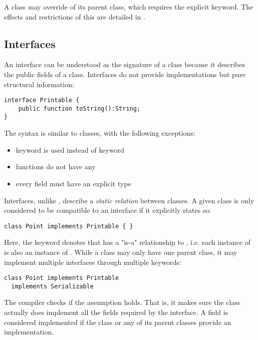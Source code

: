 A class may override  of its parent class, which requires the explicit  keyword. The effects and restrictions of this are detailed in .


\subsection{Interfaces}
\label{types-interfaces}

An interface can be understood as the signature of a class because it describes the public fields of a class. Interfaces do not provide implementations but pure structural information:

\begin{lstlisting}
interface Printable {
	public function toString():String;
}
\end{lstlisting}
The syntax is similar to classes, with the following exceptions:

\begin{itemize}
	\item {} keyword is used instead of  keyword
	\item functions do not have any 
	\item every field must have an explicit type
\end{itemize}
Interfaces, unlike , describe a \emph{static relation} between classes. A given class is only considered to be compatible to an interface if it explicitly states so:

\begin{lstlisting}
class Point implements Printable { }
\end{lstlisting}
Here, the  keyword denotes that  has a "is-a" relationship to , i.e. each instance of  is also an instance of . While a class may only have one parent class, it may implement multiple interfaces through multiple  keywords:

\begin{lstlisting}
class Point implements Printable
  implements Serializable
\end{lstlisting}

The compiler checks if the  assumption holds. That is, it makes sure the class actually does implement all the fields required by the interface. A field is considered implemented if the class or any of its parent classes provide an implementation.

